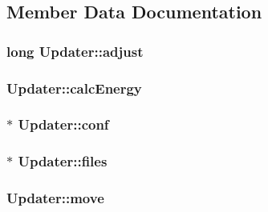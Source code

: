 \subsection{Member Data Documentation}
\hypertarget{class_updater_af7b8b8f187a21d9683cd4fea2dd5fbd7}{
\subsubsection[{adjust}]{\setlength{\rightskip}{0pt plus 5cm}long Updater\+::adjust\hspace{0.3cm}{\ttfamily [private]}}}\label{class_updater_af7b8b8f187a21d9683cd4fea2dd5fbd7}
\hypertarget{class_updater_a647ada4927eb26b2fd53a6db0167ff15}{
\subsubsection[{calc\+Energy}]{ Updater\+::calc\+Energy\hspace{0.3cm}{\ttfamily [private]}}}\label{class_updater_a647ada4927eb26b2fd53a6db0167ff15}
\hypertarget{class_updater_a2f0686ac33efa6f1712431b37d0c1ba1}{
\subsubsection[{conf}]{$\ast$ Updater\+::conf\hspace{0.3cm}{\ttfamily [private]}}}\label{class_updater_a2f0686ac33efa6f1712431b37d0c1ba1}
\hypertarget{class_updater_ab29cd3f9d7d825aa83cd98aa18b53752}{
\subsubsection[{files}]{$\ast$ Updater\+::files\hspace{0.3cm}{\ttfamily [private]}}}\label{class_updater_ab29cd3f9d7d825aa83cd98aa18b53752}
\hypertarget{class_updater_a36130f5e0d9b743e8df0e1a9a4f4d7ec}{
\subsubsection[{move}]{ Updater\+::move\hspace{0.3cm}{\ttfamily [private]}}}\label{class_updater_a36130f5e0d9b743e8df0e1a9a4f4d7ec}
